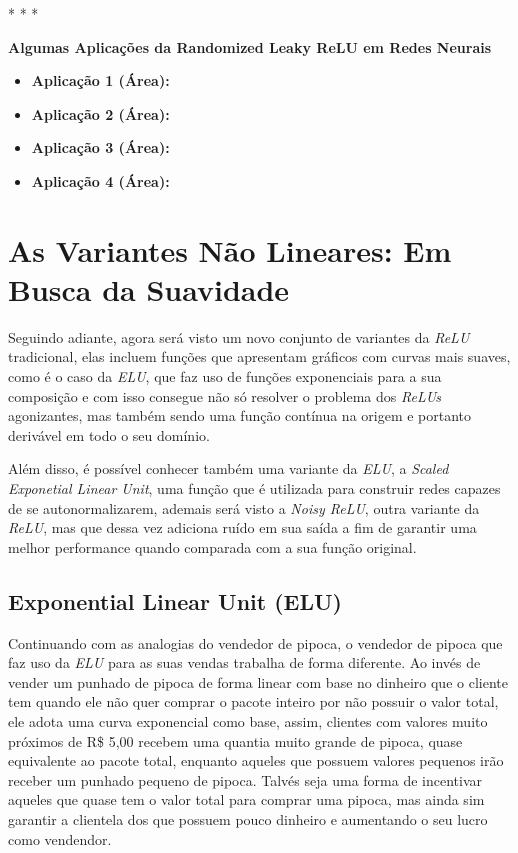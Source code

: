 \medskip
\begin{center}
 * * *
\end{center}
\medskip

\textbf{Algumas Aplicações da Randomized Leaky ReLU em Redes Neurais} 
\vspace{1em}

\begin{itemize}
    \item \textbf{Aplicação 1 (Área):}
    \item \textbf{Aplicação 2 (Área):}
    \item \textbf{Aplicação 3 (Área):}
    \item \textbf{Aplicação 4 (Área):}
\end{itemize}

\section{As Variantes Não Lineares: Em Busca da Suavidade}

Seguindo adiante, agora será visto um novo conjunto de variantes da \textit{ReLU} tradicional, elas incluem funções que apresentam gráficos com curvas mais suaves, como é o caso da \textit{ELU}, que faz uso de funções exponenciais para a sua composição e com isso consegue não só resolver o problema dos \textit{ReLUs} agonizantes, mas também sendo uma função contínua na origem e portanto derivável em todo o seu domínio.

Além disso, é possível conhecer também uma variante da \textit{ELU}, a \textit{Scaled Exponetial Linear Unit}, uma função que é utilizada para construir redes capazes de se autonormalizarem, ademais será visto a \textit{Noisy ReLU}, outra variante da \textit{ReLU}, mas que dessa vez adiciona ruído em sua saída a fim de garantir uma melhor performance quando comparada com a sua função original.

\subsection{Exponential Linear Unit (ELU)} 

Continuando com as analogias do vendedor de pipoca, o vendedor de pipoca que faz uso da \textit{ELU} para as suas vendas trabalha de forma diferente. Ao invés de vender um punhado de pipoca de forma linear com base no dinheiro que o cliente tem quando ele não quer comprar o pacote inteiro por não possuir o valor total, ele adota uma curva exponencial como base, assim, clientes com valores muito próximos de R\$ 5,00 recebem uma quantia muito grande de pipoca, quase equivalente ao pacote total, enquanto aqueles que possuem valores pequenos irão receber um punhado pequeno de pipoca. Talvés seja uma forma de incentivar aqueles que quase tem o valor total para comprar uma pipoca, mas ainda sim garantir a clientela dos que possuem pouco dinheiro e aumentando o seu lucro como vendendor.

